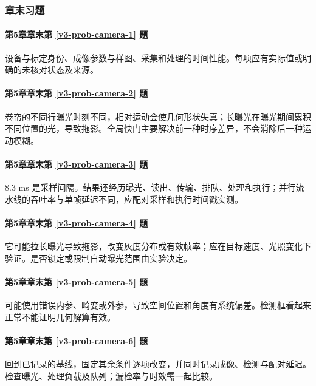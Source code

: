 \subsubsection*{章末习题}
\paragraph*{第5章章末第 \ref{v3-prob-camera-1} 题}
\begin{solution}
设备与标定身份、成像参数与样图、采集和处理的时间性能。每项应有实际值或明确的未核对状态及来源。
\end{solution}

\paragraph*{第5章章末第 \ref{v3-prob-camera-2} 题}
\begin{solution}
卷帘的不同行曝光时刻不同，相对运动会使几何形状失真；长曝光在曝光期间累积不同位置的光，导致拖影。全局快门主要解决前一种时序差异，不会消除后一种运动模糊。
\end{solution}

\paragraph*{第5章章末第 \ref{v3-prob-camera-3} 题}
\begin{solution}
8.3 ms 是采样间隔。结果还经历曝光、读出、传输、排队、处理和执行；并行流水线的吞吐率与单帧延迟不同，应配对采样和执行时间戳实测。
\end{solution}

\paragraph*{第5章章末第 \ref{v3-prob-camera-4} 题}
\begin{solution}
它可能拉长曝光导致拖影，改变灰度分布或有效帧率；应在目标速度、光照变化下验证。是否锁定或限制自动曝光范围由实验决定。
\end{solution}

\paragraph*{第5章章末第 \ref{v3-prob-camera-5} 题}
\begin{solution}
可能使用错误内参、畸变或外参，导致空间位置和角度有系统偏差。检测框看起来正常不能证明几何解算有效。
\end{solution}

\paragraph*{第5章章末第 \ref{v3-prob-camera-6} 题}
\begin{solution}
回到已记录的基线，固定其余条件逐项改变，并同时记录成像、检测与配对延迟。检查曝光、处理负载及队列；漏检率与时效需一起比较。
\end{solution}

